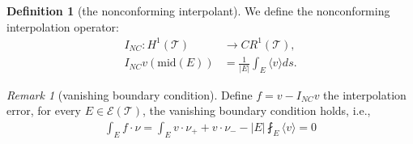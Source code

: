 \documentclass[a4paper,12pt,oneside,fleqn]{book}
\theoremstyle{definition}
\newtheorem{definition}{Definition}[section]
\theoremstyle{remark}
\newtheorem*{remark}{Remark}
\begin{document}
\begin{definition}[the nonconforming interpolant]
	We define the nonconforming interpolation operator:
\begin{equation}
\begin{aligned}
	I_{NC}: H^1(\mathcal{T}) &\rightarrow CR^1(\mathcal{T}), \\ 
	I_{NC}v(\text{mid}(E)) &= \frac{1}{|E|}\int_E \langle v\rangle ds.
\end{aligned}
\end{equation}
\end{definition}
\begin{remark}[vanishing boundary condition]
	Define $f = v - I_{NC} v$ the interpolation error, for every $E \in \mathcal{E}(\mathcal{T})$, the vanishing boundary condition holds, i.e., 
	\begin{align*}
		\int_E f \cdot \nu =  \int_E v \cdot \nu_+ + v \cdot \nu_- - |E| \fint_E \langle  v \rangle = 0
	\end{align*}
\end{remark}
\end{document}
